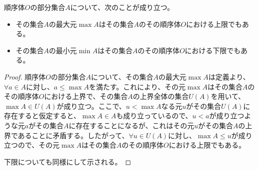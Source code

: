 \documentclass[dvipdfmx]{jsarticle}
\begin{document}
\begin{thm}\label{4.1.1.13} 順序体$O$の部分集合$A$について、次のことが成り立つ。
\begin{itemize}
\item
  その集合$A$の最大元$\max A$はその集合$A$のその順序体$O$における上限でもある。
\item
  その集合$A$の最小元$\min A$はその集合$A$のその順序体$O$における下限でもある。
\end{itemize}
\end{thm}
\begin{proof}
順序体$O$の部分集合$A$について、その集合$A$の最大元$\max A$は定義より、$\forall a \in A$に対し、$a \leq \max A$を満たす。これにより、その元$\max A$はその集合$A$のその順序体$O$における上界で、その集合$A$の上界全体の集合$U(A)$を用いて、$\max A \in U(A)$が成り立つ。ここで、$u < \max A$なる元$u$がその集合$U(A)$に存在すると仮定すると、$\max A \in A$も成り立っているので、$u < a$が成り立つような元$a$がその集合$A$に存在することになるが、これはその元$u$がその集合$A$の上界であることに矛盾する。したがって、$\forall u \in U(A)$に対し、$\max A \leq u$が成り立つので、その元$\max A$はその集合$A$のその順序体$O$における上限でもある。\par
下限についても同様にして示される。
\end{proof}
\end{document}
